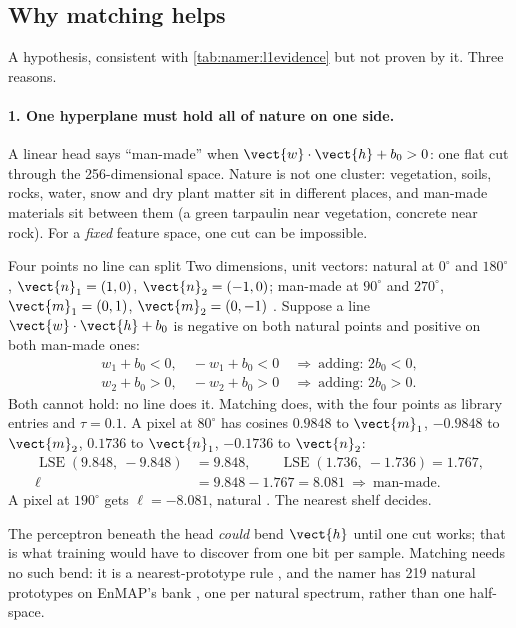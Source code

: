 \subsection{Why matching helps}

A hypothesis, consistent with \cref{tab:namer:l1evidence} but not proven by it. Three reasons.

\paragraph{1. One hyperplane must hold all of nature on one side.} A linear head says ``man-made'' when
$\vect{w}\cdot\vect{h}+b_0>0$: one flat cut through the 256-dimensional space. Nature is not one cluster: vegetation,
soils, rocks, water, snow and dry plant matter sit in different places, and man-made materials sit between them (a
green tarpaulin near vegetation, concrete near rock). For a \emph{fixed} feature space, one cut can be impossible.

\begin{worked}[label={we:namer:xor}]{Four points no line can split}
Two dimensions, unit vectors: natural at $0^\circ$ and $180^\circ$, $\vect{n}_1=(1,0)$, $\vect{n}_2=(-1,0)$; man-made at
$90^\circ$ and $270^\circ$, $\vect{m}_1=(0,1)$, $\vect{m}_2=(0,-1)$ \tagA. Suppose a line $\vect{w}\cdot\vect{h}+b_0$ is
negative on both natural points and positive on both man-made ones:
\begin{align*}
w_1+b_0<0,\quad -w_1+b_0<0 &\ \Rightarrow\ \text{adding: } 2b_0<0,\\
w_2+b_0>0,\quad -w_2+b_0>0 &\ \Rightarrow\ \text{adding: } 2b_0>0 .
\end{align*}
Both cannot hold: no line does it. Matching does, with the four points as library entries and $\tau=0.1$. A pixel at
$80^\circ$ has cosines $0.9848$ to $\vect{m}_1$, $-0.9848$ to $\vect{m}_2$, $0.1736$ to $\vect{n}_1$, $-0.1736$ to
$\vect{n}_2$:
\begin{align*}
\operatorname{LSE}(9.848,\ -9.848) &= 9.848,\qquad \operatorname{LSE}(1.736,\ -1.736)=1.767,\\
\ell &= 9.848-1.767 = 8.081\ \Rightarrow\ \text{man-made}.
\end{align*}
A pixel at $190^\circ$ gets $\ell=-8.081$, natural \tagC. The nearest shelf decides.
\end{worked}

The perceptron beneath the head \emph{could} bend $\vect{h}$ until one cut works; that is what training would have
to discover from one bit per sample. Matching needs no such bend: it is a nearest-prototype rule
\citep{snell2017prototypical}, and the namer has 219 natural prototypes on EnMAP's bank \tagC, one per natural
spectrum, rather than one half-space.

